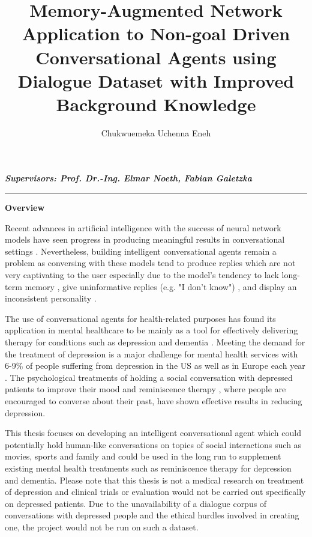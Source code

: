 \documentclass[paper=a4,11pt,parskip=half,toc=listof]{scrartcl}
\title{\vspace{-2.0cm} \LARGE {Memory-Augmented Network Application to Non-goal Driven Conversational Agents using Dialogue Dataset with Improved Background Knowledge}}
\author{\normalsize Chukwuemeka Uchenna Eneh}
\date{\vspace{-2ex}}
\def\blank{\medskip\hrule\medskip}
\begin{document}
	\maketitle
	\vspace{-1.0cm}
	\textbf{\textit{\normalsize Supervisors: Prof. Dr.-Ing. Elmar Noeth, Fabian Galetzka}}
	
	\blank
	
	\textbf{Overview}
	
	
	Recent advances in artificial intelligence with the success of neural network models have seen progress in producing meaningful results in conversational settings \cite{vinyals2015neural}. Nevertheless, building intelligent conversational agents remain a problem as conversing with these models tend to produce replies which are not very captivating to the user especially due to the model's tendency to lack long-term memory \cite{vinyals2015neural}, give uninformative replies (e.g. "I don't know") \cite{li2015diversity}, and display an inconsistent personality \cite{serban2016generative, li2016neural}. 
	
	The use of conversational agents for health-related purposes has found its application in mental healthcare to be mainly as a tool for effectively delivering therapy for conditions such as depression and dementia \cite{laranjo2018conversational, wolters2016designing, fitzpatrick2017delivering}. Meeting the demand for the treatment of depression is a major challenge for mental health services with 6-9\% of people suffering from depression in the US as well as in Europe each year \cite{wittchen2011size}. The psychological treatments of holding a social conversation with depressed patients to improve their mood \cite{williams2008exercise} and reminiscence therapy \cite{woods2005reminiscence, ashida2000effect}, where people are encouraged to converse about their past, have shown effective results in reducing depression.
	
	This thesis focuses on developing an intelligent conversational agent which could potentially hold human-like conversations on topics of social interactions such as movies, sports and family and could be used in the long run to supplement existing mental health treatments such as reminiscence therapy for depression and dementia. Please note that this thesis is not a medical research on treatment of depression and clinical trials or evaluation would not be carried out specifically on depressed patients. Due to the unavailability of a dialogue corpus of conversations with depressed people and the ethical hurdles involved in creating one, the project would not be run on such a dataset. 
	
\end{document}
